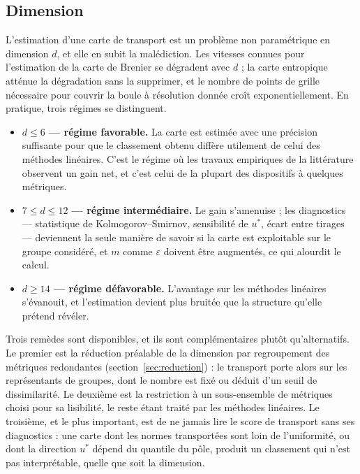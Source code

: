 \documentclass[11pt,a4paper]{article}
\theoremstyle{definition}
\theoremstyle{remark}
\begin{document}
\subsection{Dimension}
\label{sec:ot-dimension}

\medskip

L'estimation d'une carte de transport est un problème non paramétrique en dimension $d$, et
elle en subit la malédiction. Les vitesses connues pour l'estimation de la carte de Brenier
se dégradent avec $d$ ; la carte entropique atténue la dégradation sans la supprimer, et le
nombre de points de grille nécessaire pour couvrir la boule à résolution donnée croît
exponentiellement. En pratique, trois régimes se distinguent.

\medskip

\begin{itemize}[nosep,leftmargin=1.4em]
  \item \textbf{$d \le 6$ --- régime favorable.} La carte est estimée avec une précision
  suffisante pour que le classement obtenu diffère utilement de celui des méthodes
  linéaires. C'est le régime où les travaux empiriques de la littérature observent un gain
  net, et c'est celui de la plupart des dispositifs à quelques métriques.
  \item \textbf{$7 \le d \le 12$ --- régime intermédiaire.} Le gain s'amenuise ; les
  diagnostics --- statistique de Kolmogorov--Smirnov, sensibilité de $u^{*}$, écart entre
  tirages --- deviennent la seule manière de savoir si la carte est exploitable sur le
  groupe considéré, et $m$ comme $\varepsilon$ doivent être augmentés, ce qui alourdit le
  calcul.
  \item \textbf{$d \ge 14$ --- régime défavorable.} L'avantage sur les méthodes linéaires
  s'évanouit, et l'estimation devient plus bruitée que la structure qu'elle prétend révéler.
\end{itemize}

\bigskip

Trois remèdes sont disponibles, et ils sont complémentaires plutôt qu'alternatifs. Le
premier est la réduction préalable de la dimension par regroupement des métriques
redondantes (section~\ref{sec:reduction}) : le transport porte alors sur les représentants
de groupes, dont le nombre est fixé ou déduit d'un seuil de dissimilarité. Le deuxième est
la restriction à un sous-ensemble de métriques choisi pour sa lisibilité, le reste étant
traité par les méthodes linéaires. Le troisième, et le plus important, est de ne jamais lire
le score de transport sans ses diagnostics : une carte dont les normes transportées sont
loin de l'uniformité, ou dont la direction $u^{*}$ dépend du quantile du pôle, produit un
classement qui n'est pas interprétable, quelle que soit la dimension.
\end{document}
